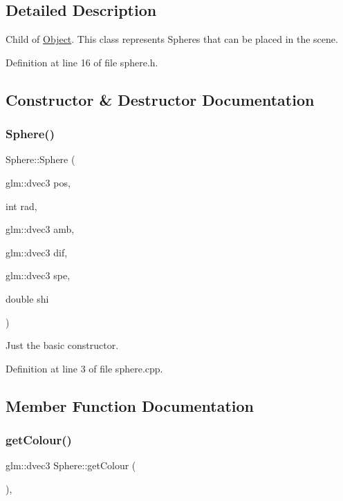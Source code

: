 \subsection{Detailed Description}
Child of \mbox{\hyperlink{class_object}{Object}}. This class represents Spheres that can be placed in the scene. 

Definition at line 16 of file sphere.\+h.



\subsection{Constructor \& Destructor Documentation}
\mbox{\label{class_sphere_a79293e081c0e5559bc764a524a3c985f}} 
\subsubsection{\texorpdfstring{Sphere()}{Sphere()}}
{\footnotesize\ttfamily Sphere\+::\+Sphere (\begin{DoxyParamCaption}\item[{glm\+::dvec3}]{pos,  }\item[{int}]{rad,  }\item[{glm\+::dvec3}]{amb,  }\item[{glm\+::dvec3}]{dif,  }\item[{glm\+::dvec3}]{spe,  }\item[{double}]{shi }\end{DoxyParamCaption})}



Just the basic constructor. 



Definition at line 3 of file sphere.\+cpp.



\subsection{Member Function Documentation}
\mbox{\label{class_sphere_a700025702852f2f6c888c7dbd720ea76}} 
\subsubsection{\texorpdfstring{get\+Colour()}{getColour()}\hspace{0.1cm}{\footnotesize\ttfamily [1/2]}}
{\footnotesize\ttfamily glm\+::dvec3 Sphere\+::get\+Colour (\begin{DoxyParamCaption}{ }\end{DoxyParamCaption})\hspace{0.3cm}{\ttfamily [override]}, {\ttfamily [virtual]}}




